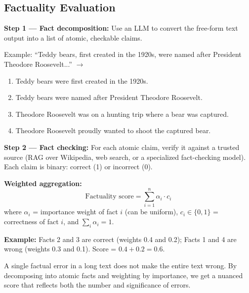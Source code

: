 \documentclass[11pt, a4paper]{article}
\begin{document}
\subsection{Factuality Evaluation}

\begin{defbox}
\textbf{Step 1 --- Fact decomposition:} Use an LLM to convert the free-form text output into a list of atomic, checkable claims.

Example: ``Teddy bears, first created in the 1920s, were named after President Theodore Roosevelt...'' $\to$
\begin{enumerate}[leftmargin=1.5em]
  \item Teddy bears were first created in the 1920s.
  \item Teddy bears were named after President Theodore Roosevelt.
  \item Theodore Roosevelt was on a hunting trip where a bear was captured.
  \item Theodore Roosevelt proudly wanted to shoot the captured bear.
\end{enumerate}

\textbf{Step 2 --- Fact checking:} For each atomic claim, verify it against a trusted source (RAG over Wikipedia, web search, or a specialized fact-checking model). Each claim is binary: correct (1) or incorrect (0).

\textbf{Weighted aggregation:}
\[
\text{Factuality score} = \sum_{i=1}^{n} \alpha_i \cdot c_i
\]
where $\alpha_i$ = importance weight of fact $i$ (can be uniform), $c_i \in \{0,1\}$ = correctness of fact $i$, and $\sum_i \alpha_i = 1$.

\textbf{Example:} Facts 2 and 3 are correct (weights 0.4 and 0.2); Facts 1 and 4 are wrong (weights 0.3 and 0.1). Score = $0.4 + 0.2 = 0.6$.
\end{defbox}

\begin{notebox}
A single factual error in a long text does not make the entire text wrong. By decomposing into atomic facts and weighting by importance, we get a nuanced score that reflects both the number and significance of errors.
\end{notebox}

\end{document}
